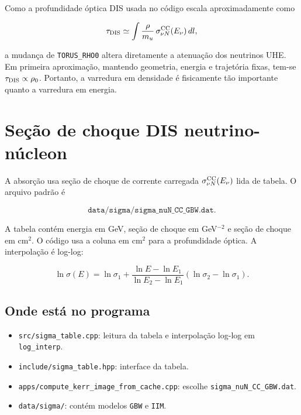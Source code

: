 \documentclass[11pt,a4paper]{article}
\begin{document}
Como a profundidade óptica DIS usada no código escala aproximadamente como

\begin{equation}
  \tau_{\rm DIS}
  \simeq
  \int \frac{\rho}{m_u}\,
  \sigma_{\nu N}^{\rm CC}(E_\nu)\,dl,
\end{equation}

a mudança de \texttt{TORUS\_RHO0} altera diretamente a atenuação dos neutrinos
UHE. Em primeira aproximação, mantendo geometria, energia e trajetória fixas,
tem-se $\tau_{\rm DIS}\propto\rho_0$. Portanto, a varredura em densidade é
fisicamente tão importante quanto a varredura em energia.

\section{Seção de choque DIS neutrino-núcleon}

A absorção usa seção de choque de corrente carregada
$\sigma_{\nu N}^{\rm CC}(E_\nu)$ lida de tabela. O arquivo padrão é

\begin{equation}
  \texttt{data/sigma/sigma\_nuN\_CC\_GBW.dat}.
\end{equation}

A tabela contém energia em GeV, seção de choque em GeV$^{-2}$ e seção de
choque em cm$^2$. O código usa a coluna em cm$^2$ para a profundidade óptica.
A interpolação é log-log:

\begin{equation}
  \ln \sigma(E) =
  \ln\sigma_1 +
  \frac{\ln E-\ln E_1}{\ln E_2-\ln E_1}
  \left(\ln\sigma_2-\ln\sigma_1\right).
\end{equation}

\subsection*{Onde está no programa}

\begin{itemize}
  \item \texttt{src/sigma\_table.cpp}: leitura da tabela e interpolação
  log-log em \texttt{log\_interp}.
  \item \texttt{include/sigma\_table.hpp}: interface da tabela.
  \item \texttt{apps/compute\_kerr\_image\_from\_cache.cpp}: escolhe
  \texttt{sigma\_nuN\_CC\_GBW.dat}.
  \item \texttt{data/sigma/}: contém modelos \texttt{GBW} e \texttt{IIM}.
\end{itemize}
\end{document}
